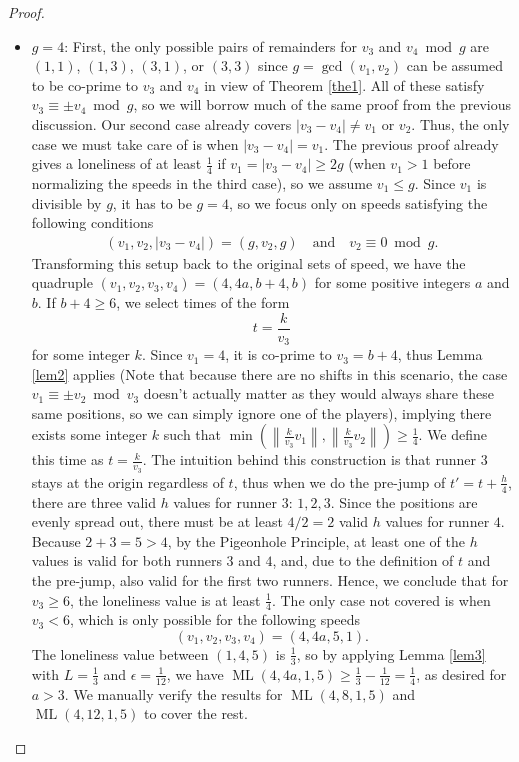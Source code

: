 \documentclass[11pt]{amsart}
\newcommand{\Norm}[1]{\left\lVert #1 \right\rVert}
\DeclareMathOperator{\ML}{ML}
\begin{document}
\begin{proof}
    \begin{itemize}
        \item $g = 4$: First, the only possible pairs of remainders for $v_3$ and $v_4 \bmod g$ are $(1,1)$, $(1,3)$, $(3,1)$, or $(3,3)$ since $g = \gcd(v_1, v_2)$ can be assumed to be co-prime to $v_3$ and $v_4$ in view of Theorem \ref{the1}. All of these satisfy $v_3 \equiv \pm v_4 \bmod g$, so we will borrow much of the same proof from the previous discussion. Our second case already covers $|v_3 - v_4| \neq v_1$ or $v_2$. Thus, the only case we must take care of is when $|v_3 - v_4| = v_1$. The previous proof already gives a loneliness of at least $\frac{1}{4}$ if $v_1 = |v_3 - v_4| \geq 2g$ (when $v_1 > 1$ before normalizing the speeds in the third case), so we assume $v_1 \leq g$. Since $v_1$ is divisible by $g$, it has to be $g = 4$, so we focus only on speeds satisfying the following conditions
        \begin{align*}(v_1,v_2,|v_3 - v_4|) = (g,v_2,g) \quad \text{and} \quad v_2 \equiv 0 \bmod {g}.\end{align*}
        Transforming this setup back to the original sets of speed, we have the quadruple $(v_1,v_2,v_3,v_4) = (4,4a,b + 4,b)$ for some positive integers $a$ and $b$. If $b + 4 \geq 6$, we select times of the form
        $$t = \frac{k}{v_3}$$
        for some integer $k$. Since $v_1 = 4$, it is co-prime to $v_3 = b + 4$, thus Lemma \ref{lem2} applies (Note that because there are no shifts in this scenario, the case $v_1 \equiv \pm v_2 \bmod {v_3}$ doesn't actually matter as they would always share these same positions, so we can simply ignore one of the players), implying there exists some integer $k$ such that $\min\left(\Norm{\frac{k}{v_3}v_1},\Norm{\frac{k}{v_3}v_2}\right) \geq \frac{1}{4}$. We define this time as $t = \frac{k}{v_3}$. The intuition behind this construction is that runner $3$ stays at the origin regardless of $t$, thus when we do the pre-jump of $t' = t + \frac{h}{4}$, there are three valid $h$ values for runner $3$: $1,2,3$. Since the positions are evenly spread out, there must be at least $4 / 2 = 2$ valid $h$ values for runner $4$. Because $2 + 3 = 5 > 4$, by the Pigeonhole Principle, at least one of the $h$ values is valid for both runners $3$ and $4$, and, due to the definition of $t$ and the pre-jump, also valid for the first two runners. Hence, we conclude that for $v_3 \geq 6$, the loneliness value is at least $\frac{1}{4}$. The only case not covered is when $v_3 < 6$, which is only possible for the following speeds
        $$(v_1,v_2,v_3,v_4) = (4,4a,5,1).$$
        The loneliness value between $(1,4,5)$ is $\frac{1}{3}$, so by applying Lemma \ref{lem3} with $L = \frac{1}{3}$ and $\epsilon = \frac{1}{12}$, we have $\ML(4,4a,1,5) \geq \frac{1}{3} - \frac{1}{12} = \frac{1}{4}$, as desired for $a > 3$. We manually verify the results for $\ML(4,8,1,5)$ and $\ML(4,12,1,5)$ to cover the rest.


\end{itemize}
\end{proof}
\end{document}
